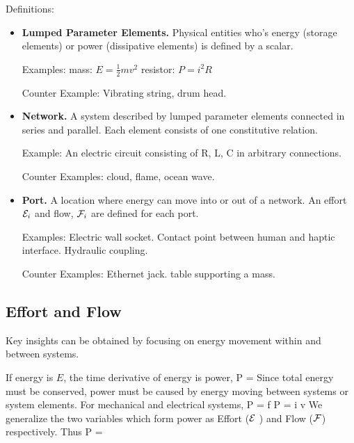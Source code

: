 Definitions:
\begin{itemize}

  \item {\bf Lumped Parameter Elements.}   Physical entities who's energy (storage elements) or power (dissipative elements) is defined by a scalar.

Examples:  mass:  $E = \frac{1}{2}mv^2$   resistor: $P = i^2R$

Counter Example:   Vibrating string, drum head.

  \item {\bf Network.}  A system described by lumped parameter elements connected in series and parallel.  Each element consists of one constitutive relation.

Example:   An electric circuit consisting of R, L, C in arbitrary connections.

Counter Examples:  cloud, flame, ocean wave.

   \item {\bf Port.}     A location where energy can move into or out of a network.  An effort $\mathcal{E}_i$ and flow, $\mathcal{F}_i$ are defined for each port.

Examples:  Electric wall socket.   Contact point between human and haptic interface.  Hydraulic coupling.

Counter Examples:  Ethernet jack.   table supporting a mass.

\end{itemize}


\subsection{Effort and Flow}
Key insights can be obtained by focusing on energy movement within and between systems.

If energy is $E$, the time derivative of energy is power,
\bq
P = 
\eq
Since total energy must be conserved, power must be caused by energy moving between systems or system elements.
For  mechanical and electrical systems,
\bq
P = f \times {} \qquad      P = i \times v
\eq
We generalize the two variables which form power as  Effort ($\mathcal{E}$ ) and Flow ($\mathcal{F}$) respectively.
Thus
\bq
P = \ef \times \fl
\eq




